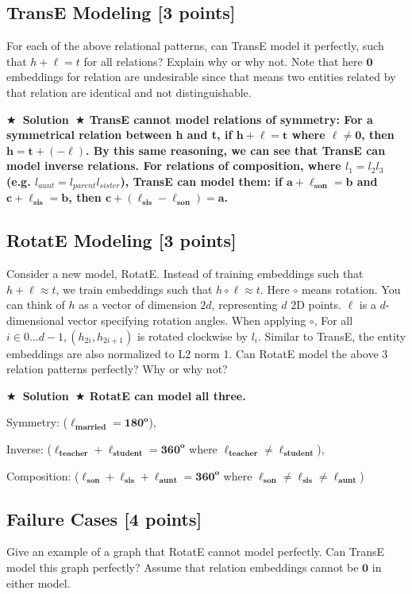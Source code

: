 \documentclass[11pt]{article}
\numberwithin{figure}{section}
\newcommand{\Solution}[1]{{\medskip \color{red} \bf $\bigstar$~\sf \textbf{Solution}~$\bigstar$ \sf #1 } \bigskip}
\begin{document}
\subsection{TransE Modeling [3 points]}
For each of the above relational patterns, can TransE model it perfectly, such that $h+\ell=t$ for all relations? Explain why or why not. Note that here $\mathbf{0}$ embeddings for relation are undesirable since that means two entities related by that relation are identical and not distinguishable.

\Solution{TransE cannot model relations of symmetry: For a symmetrical relation between h and t, if $\mathbf{h+\ell=t}$ where $\mathbf{\ell \neq 0}$, 
then $\mathbf{h=t+(-\ell)}$. By this same reasoning, we can see that TransE can model inverse relations. 
For relations of composition, where $l_1=l_2l_3$ (e.g. $l_{aunt}=l_{parent}l_{sister}$), TransE can model them:
if $\mathbf{a+\ell_{son}=b}$ and $\mathbf{c+\ell_{sis}=b}$, then $\mathbf{c+(\ell_{sis}-\ell_{son})=a}$.
}

\subsection{RotatE Modeling [3 points]}
Consider a new model, RotatE. Instead of training embeddings such that $h+\ell \approx t$, we train embeddings such that $h \circ \ell \approx t$. Here $\circ$ means rotation. You can think of $h$ as a vector of dimension $2 d$, representing $d$ $2 \mathrm{D}$ points. $\ell$ is a $d$-dimensional vector specifying rotation angles. When applying $\circ$, For all $i \in 0 \ldots d-1, \left(h_{2 i}, h_{2 i+1}\right)$ is rotated clockwise by $l_i$. Similar to TransE, the entity embeddings are also normalized to L2 norm 1. Can RotatE model the above 3 relation patterns perfectly? Why or why not?

\Solution{RotatE can model all three.


Symmetry: ($\mathbf{\ell_{married}=180^o}$),


Inverse: ($\mathbf{\ell_{teacher}+\ell_{student}=360^o}$ where $\mathbf{\ell_{teacher}\neq\ell_{student}}$),


Composition: ($\mathbf{\ell_{son}+\ell_{sis}+\ell_{aunt}=360^o}$ where $\mathbf{\ell_{son}\neq\ell_{sis}\neq\ell_{aunt}}$)
}

\subsection{Failure Cases [4 points]}
Give an example of a graph that RotatE cannot model perfectly. Can TransE model this graph perfectly? Assume that relation embeddings cannot be $\mathbf{0}$ in either model.
\end{document}
